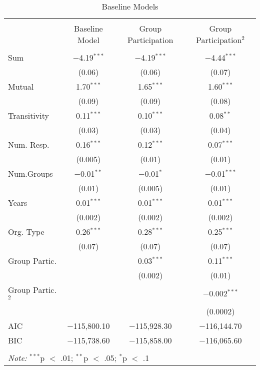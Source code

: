 
\begin{table}[!htbp] \centering 
  \caption{Baseline Models} 
  \label{table:basemods} 
\begin{tabular}{@{\extracolsep{5pt}}lccc} 
\\[-1.8ex]\hline \\[-1.8ex] 
 & Baseline Model & Group Participation & Group Participation$^2$ \\ 
\hline \\[-1.8ex] 
 Sum & $-$4.19$^{***}$ & $-$4.19$^{***}$ & $-$4.44$^{***}$ \\ 
  & (0.06) & (0.06) & (0.07) \\ 
  Mutual & 1.70$^{***}$ & 1.65$^{***}$ & 1.60$^{***}$ \\ 
  & (0.09) & (0.09) & (0.08) \\ 
  Transitivity & 0.11$^{***}$ & 0.10$^{***}$ & 0.08$^{**}$ \\ 
  & (0.03) & (0.03) & (0.04) \\ 
  Num. Resp. & 0.16$^{***}$ & 0.12$^{***}$ & 0.07$^{***}$ \\ 
  & (0.005) & (0.01) & (0.01) \\ 
  Num.Groups & $-$0.01$^{**}$ & $-$0.01$^{*}$ & $-$0.01$^{***}$ \\ 
  & (0.01) & (0.005) & (0.01) \\ 
  Years & 0.01$^{***}$ & 0.01$^{***}$ & 0.01$^{***}$ \\ 
  & (0.002) & (0.002) & (0.002) \\ 
  Org. Type & 0.26$^{***}$ & 0.28$^{***}$ & 0.25$^{***}$ \\ 
  & (0.07) & (0.07) & (0.07) \\ 
  Group Partic. &  & 0.03$^{***}$ & 0.11$^{***}$ \\ 
  &  & (0.002) & (0.01) \\ 
  Group Partic.$^2$ &  &  & $-$0.002$^{***}$ \\ 
  &  &  & (0.0002) \\ 
 AIC & $-$115,800.10 & $-$115,928.30 & $-$116,144.70 \\ 
BIC & $-$115,738.60 & $-$115,858.00 & $-$116,065.60 \\ 
\hline \\[-1.8ex] 
\multicolumn{4}{l}{\textit{Note:} $^{***}$p $<$ .01; $^{**}$p $<$ .05; $^{*}$p $<$ .1} \\ 
\end{tabular} 
\end{table} 
